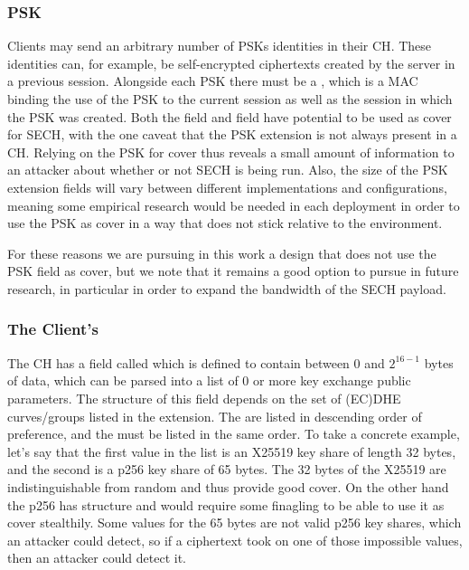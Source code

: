 \subsubsection{PSK}
Clients may send an arbitrary number of \acp{PSK}
identities in their \ac{CH}.
These identities can, for example, be self-encrypted ciphertexts created by the server
in a previous session.
Alongside each \ac{PSK} there must be a ,
which is a \ac{MAC} binding the use of the \ac{PSK} to the current session as well
as the session in which the \ac{PSK} was created.
Both the   field and  field
have potential to be used as cover for \ac{SECH},
with the one caveat that the \ac{PSK} extension is not always present
in a \ac{CH}.
Relying on the \ac{PSK} for cover thus reveals a small amount of information
to an attacker about whether or not \ac{SECH} is being run.
Also, the size of the \ac{PSK} extension fields will vary between different
implementations and configurations,
meaning some empirical research would be needed in each deployment
in order to use the \ac{PSK} as cover in a way that does not stick relative
to the environment.

For these reasons we are pursuing in this work a design that does not use
the \ac{PSK} field as cover,
but we note that it remains a good option to pursue in future research,
in particular in order to expand the bandwidth of the \ac{SECH} payload.
\subsubsection{The Client's }
The \ac{CH} has a field called  which is defined to contain between $0$ and $2^{16-1}$ bytes of data,
which can be parsed into a list of 0 or more key exchange public parameters.
The structure of this field depends on the set of
(\ac{EC})\ac{DHE} curves/groups listed in the  extension.
The  are listed in descending order of preference,
and the  must be listed in the same order.
To take a concrete example, let's say that
the first value in the  list
is an \ac{X25519} key share of length 32 bytes,
and the second is a \ac{p256} key share of 65 bytes.
The 32 bytes of the \ac{X25519} are indistinguishable from random and thus provide good cover.
On the other hand the \ac{p256} has structure and would require
some finagling to be able to use it as cover stealthily.
Some values for the 65 bytes are not valid \ac{p256} key shares,
which an attacker could detect, so if a ciphertext took on one of those
impossible values, then an attacker could detect it.

